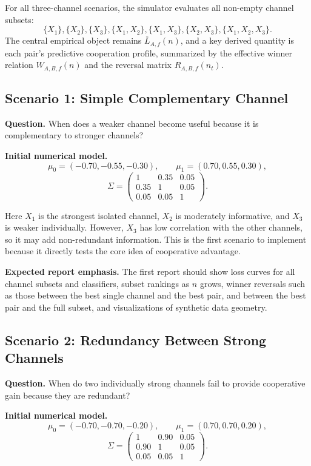 \documentclass[11pt,a4paper]{article}
\begin{document}
For all three-channel scenarios, the simulator evaluates all non-empty channel subsets:
\[
\{X_1\},\{X_2\},\{X_3\},\{X_1,X_2\},\{X_1,X_3\},\{X_2,X_3\},\{X_1,X_2,X_3\}.
\]
The central empirical object remains $\overline{L}_{A,f}(n)$, and a key derived quantity is each pair's predictive cooperation profile, summarized by the effective winner relation $W_{A,B,f}(n)$ and the reversal matrix $R_{A,B,f}(n_t)$.

\subsection{Scenario 1: Simple Complementary Channel}

\textbf{Question.} When does a weaker channel become useful because it is complementary to stronger channels?

\textbf{Initial numerical model.}
\[
    \mu_0=(-0.70,-0.55,-0.30),
    \qquad
    \mu_1=(0.70,0.55,0.30),
\]
\[
\Sigma=
\begin{pmatrix}
1 & 0.35 & 0.05\\
0.35 & 1 & 0.05\\
0.05 & 0.05 & 1
\end{pmatrix}.
\]

Here $X_1$ is the strongest isolated channel, $X_2$ is moderately informative, and $X_3$ is weaker individually. However, $X_3$ has low correlation with the other channels, so it may add non-redundant information. This is the first scenario to implement because it directly tests the core idea of cooperative advantage.

\textbf{Expected report emphasis.} The first report should show loss curves for all channel subsets and classifiers, subset rankings as $n$ grows, winner reversals such as those between the best single channel and the best pair, and between the best pair and the full subset, and visualizations of synthetic data geometry.

\subsection{Scenario 2: Redundancy Between Strong Channels}

\textbf{Question.} When do two individually strong channels fail to provide cooperative gain because they are redundant?

\textbf{Initial numerical model.}
\[
    \mu_0=(-0.70,-0.70,-0.20),
    \qquad
    \mu_1=(0.70,0.70,0.20),
\]
\[
\Sigma=
\begin{pmatrix}
1 & 0.90 & 0.05\\
0.90 & 1 & 0.05\\
0.05 & 0.05 & 1
\end{pmatrix}.
\]
\end{document}
